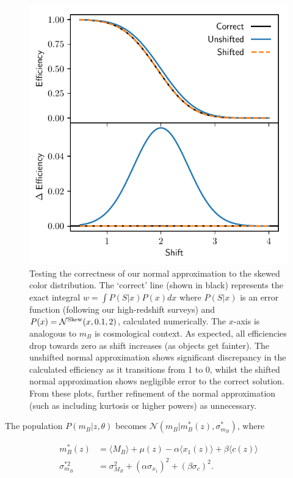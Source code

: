 \documentclass[a4paper,fleqn,usenatbib]{emulateapj}
\begin{document}
\begin{figure}
	\begin{center}
		\includegraphics[width=\columnwidth]{shift.pdf}
	\end{center}
	\caption{Testing the correctness of our normal approximation to the skewed color distribution. The `correct' line (shown in black) represents the exact integral $w = \int P(S|x) P(x) dx$ where $P(S|x)$ is an error function (following our high-redshift surveys) and $P(x) = \mathcal{N}^{\rm Skew}(x, 0.1, 2)$, calculated numerically. The $x$-axis is analogous to $m_B$ is cosmological context. As expected, all efficiencies drop towards zero as shift increases (as objects get fainter). The unshifted normal approximation shows significant discrepancy in the calculated efficiency as it transitions from 1 to 0, whilst the shifted normal approximation shows negligible error to the correct solution. From these plots, further refinement of the normal approximation (such as including kurtosis or higher powers) as unnecessary.}
	\label{fig:shift}
\end{figure}



The population $P(m_B | z, \theta)$ becomes $\mathcal{N}(m_B|m_B^*(z), \sigma^*_{m_B})$, where

\begin{align}
m_B^*(z) &= \langle M_B \rangle + \mu(z) - \alpha \langle x_1(z) \rangle + \beta \langle c(z) \rangle \\
\sigma^{*2}_{m_B} &= \sigma_{M_B}^2 + (\alpha \sigma_{x_1})^2 + (\beta \sigma_c)^2.
\end{align}
\end{document}
